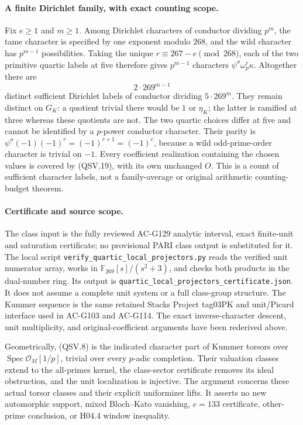 \paragraph{A finite Dirichlet family, with exact counting scope.}
Fix \(e\ge1\) and \(m\ge1\).  Among Dirichlet characters of
conductor dividing \(p^m\), the tame character is specified by
one exponent modulo \(268\), and the wild character has
\(p^{m-1}\) possibilities.  Taking the unique
\(r\equiv267-e\pmod{268}\), each of the two primitive quartic
labels at five therefore gives \(p^{m-1}\) characters
\(\psi^\sigma\omega_p^r\kappa\).  Altogether there are
\[
                           2\cdot269^{m-1}
 \tag{QSV.23}
\]
distinct sufficient Dirichlet labels of conductor dividing
\(5\cdot269^m\).  They remain distinct on \(G_K\):
a quotient trivial there would be \(1\) or \(\eta_K\);
the latter is ramified at three whereas these quotients are not.
The two quartic choices differ at five and cannot be identified
by a \(p\)-power conductor character.
Their parity is
\(\psi^\sigma(-1)(-1)^r=(-1)^{r+1}=(-1)^e\), because a
wild odd-prime-order character is trivial on \(-1\).
Every coefficient realization containing the chosen values is
covered by (QSV.19), with its own unchanged \(O\).
This is a count of sufficient character labels, not a family-average
or original arithmetic counting-budget theorem.

\paragraph{Certificate and source scope.}
The class input is the fully reviewed AC-G129 analytic
interval, exact finite-unit and saturation certificate; no
provisional PARI class output is substituted for it.
The local script
\texttt{verify\_quartic\_local\_projectors.py} reads the
verified unit numerator array, works in
\(\mathbb F_{269}[s]/(s^2+3)\), and checks both products in
the dual-number ring.  Its output is
\texttt{quartic\_local\_projectors\_certificate.json}.
It does not assume a complete unit system or a full class-group
structure.  The Kummer sequence is the same retained Stacks
Project tag03PK and unit/Picard interface used in AC-G103 and
AC-G114.  The exact inverse-character descent, unit multiplicity,
and original-coefficient arguments have been rederived above.

Geometrically, (QSV.8) is the indicated character part of Kummer
torsors over \(\operatorname{Spec}\mathcal O_M[1/p]\), trivial
over every \(p\)-adic completion.  Their valuation classes extend
to the all-primes kernel, the class-sector certificate removes
its ideal obstruction, and the unit localization is injective.
The argument concerns these actual torsor classes and their
explicit uniformizer lifts.  It asserts no new automorphic
support, mixed Bloch--Kato vanishing, \(e=133\) certificate,
other-prime conclusion, or H04.4 window inequality.
